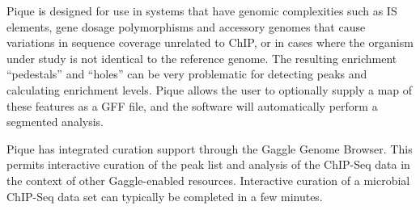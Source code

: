 \documentclass{bioinfo}
\begin{document}
Pique is designed for use in systems that have genomic complexities
such as IS elements, gene dosage polymorphisms and accessory genomes
that cause variations in sequence coverage unrelated to ChIP, or in
cases where the organism under study is not identical to the reference
genome. The resulting enrichment ``pedestals'' and ``holes'' can be
very problematic for detecting peaks and calculating enrichment
levels. Pique allows the user to optionally supply a map of these
features as a GFF file, and the software will automatically perform a
segmented analysis.

Pique has integrated curation support through the Gaggle Genome
Browser. This permits interactive curation of the peak list and
analysis of the ChIP-Seq data in the context of other Gaggle-enabled
resources. Interactive curation of a microbial ChIP-Seq data set can
typically be completed in a few minutes.
\end{document}
